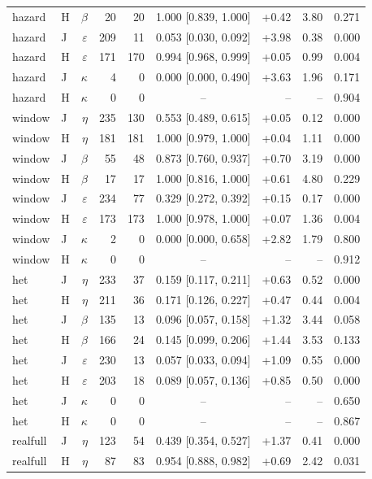 \begin{longtable}{llrrrcrrr}
hazard & H & $\beta$ & 20 & 20 & 1.000 [0.839, 1.000] & +0.42 & 3.80 & 0.271 \\
hazard & J & $\varepsilon$ & 209 & 11 & 0.053 [0.030, 0.092] & +3.98 & 0.38 & 0.000 \\
hazard & H & $\varepsilon$ & 171 & 170 & 0.994 [0.968, 0.999] & +0.05 & 0.99 & 0.004 \\
hazard & J & $\kappa$ & 4 & 0 & 0.000 [0.000, 0.490] & +3.63 & 1.96 & 0.171 \\
hazard & H & $\kappa$ & 0 & 0 & -- & -- & -- & 0.904 \\
\midrule
window & J & $\eta$ & 235 & 130 & 0.553 [0.489, 0.615] & +0.05 & 0.12 & 0.000 \\
window & H & $\eta$ & 181 & 181 & 1.000 [0.979, 1.000] & +0.04 & 1.11 & 0.000 \\
window & J & $\beta$ & 55 & 48 & 0.873 [0.760, 0.937] & +0.70 & 3.19 & 0.000 \\
window & H & $\beta$ & 17 & 17 & 1.000 [0.816, 1.000] & +0.61 & 4.80 & 0.229 \\
window & J & $\varepsilon$ & 234 & 77 & 0.329 [0.272, 0.392] & +0.15 & 0.17 & 0.000 \\
window & H & $\varepsilon$ & 173 & 173 & 1.000 [0.978, 1.000] & +0.07 & 1.36 & 0.004 \\
window & J & $\kappa$ & 2 & 0 & 0.000 [0.000, 0.658] & +2.82 & 1.79 & 0.800 \\
window & H & $\kappa$ & 0 & 0 & -- & -- & -- & 0.912 \\
\midrule
het & J & $\eta$ & 233 & 37 & 0.159 [0.117, 0.211] & +0.63 & 0.52 & 0.000 \\
het & H & $\eta$ & 211 & 36 & 0.171 [0.126, 0.227] & +0.47 & 0.44 & 0.004 \\
het & J & $\beta$ & 135 & 13 & 0.096 [0.057, 0.158] & +1.32 & 3.44 & 0.058 \\
het & H & $\beta$ & 166 & 24 & 0.145 [0.099, 0.206] & +1.44 & 3.53 & 0.133 \\
het & J & $\varepsilon$ & 230 & 13 & 0.057 [0.033, 0.094] & +1.09 & 0.55 & 0.000 \\
het & H & $\varepsilon$ & 203 & 18 & 0.089 [0.057, 0.136] & +0.85 & 0.50 & 0.000 \\
het & J & $\kappa$ & 0 & 0 & -- & -- & -- & 0.650 \\
het & H & $\kappa$ & 0 & 0 & -- & -- & -- & 0.867 \\
\midrule
realfull & J & $\eta$ & 123 & 54 & 0.439 [0.354, 0.527] & +1.37 & 0.41 & 0.000 \\
realfull & H & $\eta$ & 87 & 83 & 0.954 [0.888, 0.982] & +0.69 & 2.42 & 0.031 \\

\end{longtable}
